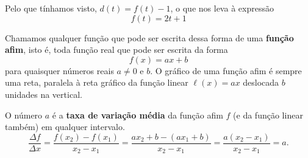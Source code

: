 Pelo que tínhamos visto, $ d(t)=f(t)-1 $, o que nos leva à expressão
\[
f(t)=2t+1
\]

\begin{observation}
Chamamos qualquer função que pode ser escrita dessa forma de uma \textbf{função afim}, isto é, toda função real que pode ser escrita da forma
\[
f(x)=ax+b
\]
para quaisquer números reais $ a\neq 0 $ e $ b$. O gráfico de uma função afim é sempre uma reta, paralela à reta gráfico da função linear $ \ell(x)=ax $ deslocada $b$ unidades na vertical.

O número $ a $ é a \textbf{taxa de variação média} da função afim $ f $ (e da função linear também) em qualquer intervalo.
\[
\dfrac{\Delta f}{\Delta x}= \dfrac{f(x_2)-f(x_1)}{x_2-x_1}= \dfrac{ax_2+b-(ax_1+b)}{x_2-x_1}= \dfrac{a(x_2-x_1)}{x_2-x_1}=a.
\]


\begin{figure}[H]
\centering


\end{figure}

\end{observation}

